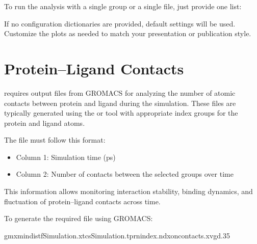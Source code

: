 \documentclass[a4paper,10pt,english]{sphinxmanual}
\begin{document}
\sphinxAtStartPar
To run the analysis with a single group or a single file, just provide one list:

\begin{sphinxVerbatim}[commandchars=\\\{\}]
 
\end{sphinxVerbatim}

\sphinxAtStartPar
If no configuration dictionaries are provided, default settings will be used. Customize the plots as needed to match your presentation or publication style.


\section{Protein–Ligand Contacts}
\label{\detokenize{Input:proteinligand-contacts}}
\sphinxAtStartPar
{} requires  output files from GROMACS for analyzing the number of atomic contacts between protein and ligand during the simulation. These files are typically generated using the  or  tool with appropriate index groups for the protein and ligand atoms.

\sphinxAtStartPar
The  file must follow this format:
\begin{itemize}
\item {} 
\sphinxAtStartPar
Column 1: Simulation time (ps)

\item {} 
\sphinxAtStartPar
Column 2: Number of contacts between the selected groups over time

\end{itemize}

\sphinxAtStartPar
This information allows monitoring interaction stability, binding dynamics, and fluctuation of protein–ligand contacts across time.

\sphinxAtStartPar
To generate the required  file using GROMACS:

\begin{sphinxVerbatim}[commandchars=\\\{\}]
gmxmindist\PYGZhy{}fSimulation.xtc\PYGZhy{}sSimulation.tpr\PYGZhy{}nindex.ndx\PYGZhy{}oncontacts.xvg\PYGZhy{}d.35
\end{sphinxVerbatim}
\end{document}
